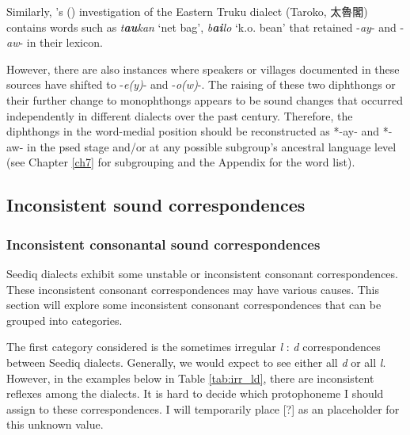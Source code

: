 Similarly, \citeauthor{tashiro1900easterntw}'s (\citeyear{tashiro1900easterntw}) investigation of the Eastern Truku dialect (Taroko, 太魯閣) contains words such as \textit{t\textbf{au}kan} `net bag', \textit{b\textbf{ai}lo} `k.o. bean' that retained -\textit{ay}- and -\textit{aw}- in their lexicon. 

However, there are also instances where speakers or villages documented in these sources have shifted to -\textit{e(y)}- and -\textit{o(w)}-. The raising of these two diphthongs or their further change to monophthongs appears to be sound changes that occurred independently in different dialects over the past century. Therefore, the diphthongs in the word-medial position should be reconstructed as *-ay- and *-aw- in the \acl{psed} stage and/or at any possible subgroup's ancestral language level (see Chapter \ref{ch7} for subgrouping and the Appendix for the word list).

\subsection{Inconsistent sound correspondences}

\subsubsection{Inconsistent consonantal sound correspondences}

Seediq dialects exhibit some unstable or inconsistent consonant correspondences. These inconsistent consonant correspondences may have various causes. This section will explore some inconsistent consonant correspondences that can be grouped into categories.


The first category considered is the sometimes irregular \textit{l} : \textit{d} correspondences between Seediq dialects. Generally, we would expect to see either all \textit{d} or all \textit{l}. However, in the examples below in Table \ref{tab:irr_ld}, there are inconsistent reflexes among the dialects. It is hard to decide which protophoneme I should assign to these correspondences. I will temporarily place [?] as an placeholder for this unknown value.

